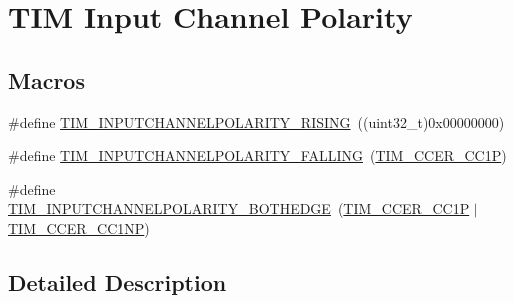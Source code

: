 \hypertarget{group___t_i_m___input___channel___polarity}{\section{T\-I\-M Input Channel Polarity}
\label{group___t_i_m___input___channel___polarity}
}
\subsection*{Macros}
\begin{DoxyCompactItemize}
\item 
\#define \hyperlink{group___t_i_m___input___channel___polarity_ga4f4cede88a4ad4b33e81f2567e9bb08f}{T\-I\-M\-\_\-\-I\-N\-P\-U\-T\-C\-H\-A\-N\-N\-E\-L\-P\-O\-L\-A\-R\-I\-T\-Y\-\_\-\-R\-I\-S\-I\-N\-G}~((uint32\-\_\-t)0x00000000)
\item 
\#define \hyperlink{group___t_i_m___input___channel___polarity_ga07441a8c0a52234e30f471c23803450c}{T\-I\-M\-\_\-\-I\-N\-P\-U\-T\-C\-H\-A\-N\-N\-E\-L\-P\-O\-L\-A\-R\-I\-T\-Y\-\_\-\-F\-A\-L\-L\-I\-N\-G}~(\hyperlink{group___peripheral___registers___bits___definition_ga0ca0aedba14241caff739afb3c3ee291}{T\-I\-M\-\_\-\-C\-C\-E\-R\-\_\-\-C\-C1\-P})
\item 
\#define \hyperlink{group___t_i_m___input___channel___polarity_gaab2598881d1f19158e77723c5d29d6ac}{T\-I\-M\-\_\-\-I\-N\-P\-U\-T\-C\-H\-A\-N\-N\-E\-L\-P\-O\-L\-A\-R\-I\-T\-Y\-\_\-\-B\-O\-T\-H\-E\-D\-G\-E}~(\hyperlink{group___peripheral___registers___bits___definition_ga0ca0aedba14241caff739afb3c3ee291}{T\-I\-M\-\_\-\-C\-C\-E\-R\-\_\-\-C\-C1\-P} $\vert$ \hyperlink{group___peripheral___registers___bits___definition_ga403fc501d4d8de6cabee6b07acb81a36}{T\-I\-M\-\_\-\-C\-C\-E\-R\-\_\-\-C\-C1\-N\-P})
\end{DoxyCompactItemize}


\subsection{Detailed Description}


